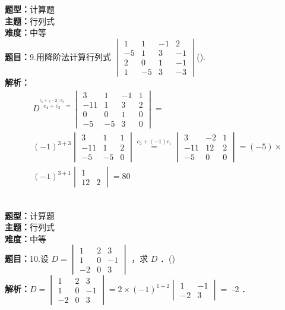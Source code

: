 \documentclass{ctexart}
\newenvironment{question}[5]{%
	\noindent\textbf{题型：}#1\\
	\textbf{主题：}#2\\
	\textbf{难度：}#3\\
	\textbf{题目：}#4\\
	\textbf{解析：}#5\\
	\vspace{1em}
}{}
\begin{document}
	\begin{question}
		{计算题}
		{行列式}
		{中等}
		{9.用降阶法计算行列式 \(\begin{vmatrix}1 & 1 & -1 & 2 \\ -5 & 1 & 3 & -1 \\ 2 & 0 & 1 & -1 \\ 1 & -5 & 3 & -3\end{vmatrix}\)(\qquad). }
		{\[
			\begin{aligned}
				&D^{\stackrel{c_1+(-2) c_3}{c_4+c_3}=}\begin{vmatrix}
					3 & 1 & -1 & 1 \\
					-11 & 1 & 3 & 2 \\
					0 & 0 & 1 & 0 \\
					-5 & -5 & 3 & 0
				\end{vmatrix}= \\
				& (-1)^{3+3}\begin{vmatrix}
					3 & 1 & 1 \\
					-11 & 1 & 2 \\
					-5 & -5 & 0
				\end{vmatrix} \stackrel{c_2+(-1) c_1}{=}\begin{vmatrix}
					3 & -2 & 1 \\
					-11 & 12 & 2 \\
					-5 & 0 & 0
				\end{vmatrix}=(-5) \times \\
				& (-1)^{3+1}\begin{vmatrix}
					1 \\
					12 & 2
				\end{vmatrix}=80
			\end{aligned}
			\]}
	\end{question}
	
	
	\begin{question}
		{计算题}
		{行列式}
		{中等}
		{10.设 \(D=\begin{vmatrix}1 & 2 & 3 \\ 1 & 0 & -1 \\ -2 & 0 & 3\end{vmatrix}\) ，求 \(D\) ．(\qquad)}
		{\(D=\begin{vmatrix}1 & 2 & 3 \\ 1 & 0 & -1 \\ -2 & 0 & 3\end{vmatrix}=2 \times(-1)^{1+2}\begin{vmatrix}1 & -1 \\ -2 & 3\end{vmatrix}=\) -2 ．}
	\end{question}
	
\end{document}
